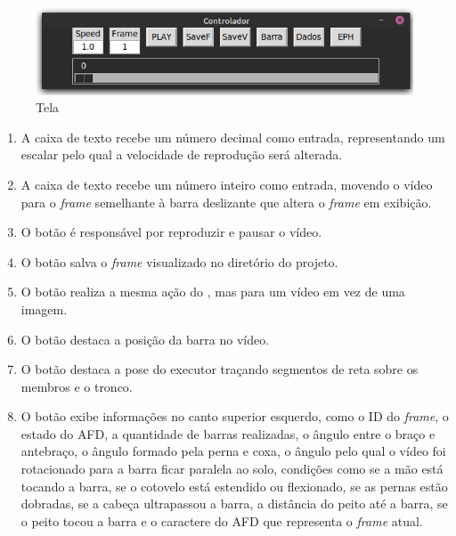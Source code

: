 \begin{figure}[H]
	\centering
	\caption{Tela }
	\includegraphics[scale=0.5]{figuras/view/painel_controller.png}
\end{figure}


\begin{enumerate}
    \item A caixa de texto  recebe um número decimal como entrada, representando um escalar pelo qual a velocidade de reprodução será alterada.
    
    \item A caixa de texto  recebe um número inteiro como entrada, movendo o vídeo para o \textit{frame} semelhante à barra deslizante que altera o \textit{frame} em exibição.
    
    \item O botão  é responsável por reproduzir e pausar o vídeo.
    
    \item O botão  salva o \textit{frame} visualizado no diretório  do projeto.
    
    \item O botão  realiza a mesma ação do , mas para um vídeo em vez de uma imagem.
    
    \item O botão  destaca a posição da barra no vídeo.
    
    \item O botão  destaca a pose do executor traçando segmentos de reta sobre os membros e o tronco.
    
    \item O botão  exibe informações no canto superior esquerdo, como o ID do \textit{frame}, o estado do \ac{AFD}, a quantidade de barras realizadas, o ângulo entre o braço e antebraço, o ângulo formado pela perna e coxa, o ângulo pelo qual o vídeo foi rotacionado para a barra ficar paralela ao solo, condições como se a mão está tocando a barra, se o cotovelo está estendido ou flexionado, se as pernas estão dobradas, se a cabeça ultrapassou a barra, a distância do peito até a barra, se o peito tocou a barra e o caractere do \ac{AFD} que representa o \textit{frame} atual.
\end{enumerate}



